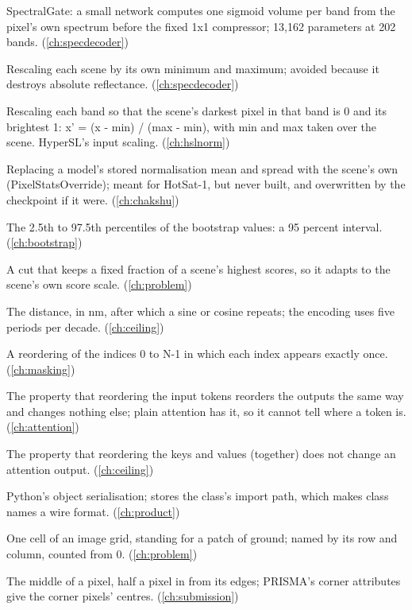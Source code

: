 \begin{description}[style=nextline,leftmargin=1.2em,font=\normalfont\bfseries]
\item[Per-pixel gate] SpectralGate: a small network computes one sigmoid volume per band from the pixel's own spectrum before the fixed 1x1 compressor; 13,162 parameters at 202 bands. (\cref{ch:specdecoder})
\item[Per-scene min-max normalisation] Rescaling each scene by its own minimum and maximum; avoided because it destroys absolute reflectance. (\cref{ch:specdecoder})
\item[Per-scene min-max scaling] Rescaling each band so that the scene's darkest pixel in that band is 0 and its brightest 1: x' = (x - min) / (max - min), with min and max taken over the scene. HyperSL's input scaling. (\cref{ch:hslnorm})
\item[Per-scene override] Replacing a model's stored normalisation mean and spread with the scene's own (PixelStatsOverride); meant for HotSat-1, but never built, and overwritten by the checkpoint if it were. (\cref{ch:chakshu})
\item[Percentile interval] The 2.5th to 97.5th percentiles of the bootstrap values: a 95 percent interval. (\cref{ch:bootstrap})
\item[Percentile threshold] A cut that keeps a fixed fraction of a scene's highest scores, so it adapts to the scene's own score scale. (\cref{ch:problem})
\item[Period] The distance, in nm, after which a sine or cosine repeats; the encoding uses five periods per decade. (\cref{ch:ceiling})
\item[Permutation] A reordering of the indices 0 to N-1 in which each index appears exactly once. (\cref{ch:masking})
\item[Permutation equivariance] The property that reordering the input tokens reorders the outputs the same way and changes nothing else; plain attention has it, so it cannot tell where a token is. (\cref{ch:attention})
\item[Permutation invariance] The property that reordering the keys and values (together) does not change an attention output. (\cref{ch:ceiling})
\item[Pickle] Python's object serialisation; stores the class's import path, which makes class names a wire format. (\cref{ch:product})
\item[Pixel] One cell of an image grid, standing for a patch of ground; named by its row and column, counted from 0. (\cref{ch:problem})
\item[Pixel centre] The middle of a pixel, half a pixel in from its edges; PRISMA's corner attributes give the corner pixels' centres. (\cref{ch:submission})

\end{description}
